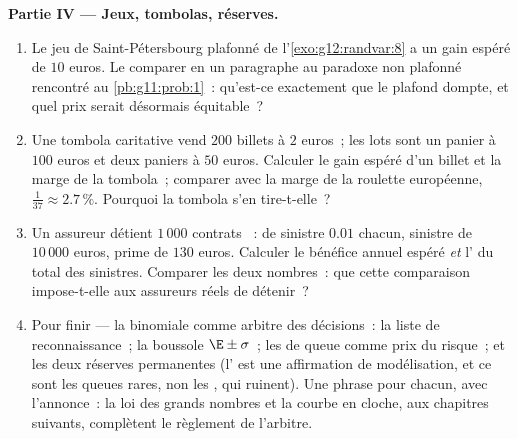 \begin{problem}
\medskip
\noindent\textbf{Partie IV --- Jeux, tombolas, réserves.}
\begin{enumerate}[resume]
  \item Le jeu de Saint-Pétersbourg plafonné de
        l'\cref{exo:g12:randvar:8} a un gain espéré de $10$ euros.
        Le comparer en un paragraphe au paradoxe non plafonné
        rencontré au \cref{pb:g11:prob:1}~: qu'est-ce exactement que
        le plafond dompte, et quel prix serait désormais équitable~?
  \item Une tombola caritative vend $200$ billets à $2$ euros~;
        les lots sont un panier à $100$ euros et deux paniers à
        $50$ euros. Calculer le gain espéré d'un billet et la marge
        de la tombola~; comparer avec la marge de la roulette
        européenne, $\frac{1}{37} \approx 2.7\,\%$. Pourquoi la
        tombola s'en tire-t-elle~?
  \item Un assureur détient $1\,000$ contrats ~:
         de sinistre $0.01$ chacun, sinistre de
        $10\,000$ euros, prime de $130$ euros. Calculer le bénéfice
        annuel espéré \emph{et} l' du total des sinistres.
        Comparer les deux nombres~: que cette comparaison
        impose-t-elle aux assureurs réels de détenir~?
  \item Pour finir --- la binomiale comme arbitre des décisions~:
        la liste de reconnaissance~; la boussole $\E \pm \sigma$~;
        les  de queue comme prix du risque~; et les deux
        réserves permanentes (l' est une affirmation de
        modélisation, et ce sont les queues rares, non les ,
        qui ruinent). Une phrase pour chacun, avec l'annonce~: la
        loi des grands nombres et la courbe en cloche, aux chapitres
        suivants, complètent le règlement de l'arbitre.
\end{enumerate}
\end{problem}
